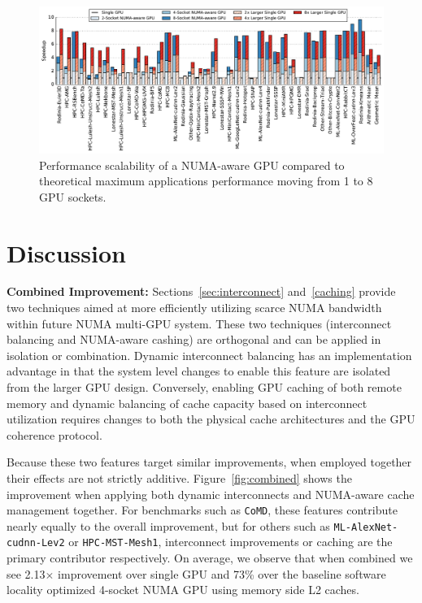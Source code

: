 \begin{figure}[t]
    \centering
    \includegraphics[width=1.0\textwidth]{figures/plot_scalability_mgpu_WB.pdf}
    \caption{Performance scalability of a NUMA-aware GPU compared to theoretical 
    maximum applications performance moving from 1 to 8 GPU sockets.}
    \label{fig:scalability}
    \vspace{-.2in}
\end{figure}

\section {Discussion}
\label{sec:discussion}
\textbf{Combined Improvement:} Sections~\ref{sec:interconnect} 
and~\ref{caching} provide two techniques aimed at more efficiently utilizing 
scarce NUMA bandwidth within future NUMA multi-GPU system. These two 
techniques (interconnect balancing and NUMA-aware cashing) are orthogonal and 
can be applied in isolation or combination.  Dynamic interconnect balancing 
has an implementation advantage in that the system level changes to enable 
this feature are isolated from the larger GPU design.  Conversely, enabling 
GPU caching of both remote memory and dynamic balancing of cache capacity 
based on interconnect utilization requires changes to both the physical cache 
architectures and the GPU coherence protocol.

Because these two features target similar improvements, when employed 
together their effects are not strictly additive.  Figure~\ref{fig:combined} 
shows the improvement when applying both dynamic interconnects and NUMA-aware 
cache management together.  For benchmarks such as \texttt{CoMD}, these 
features contribute nearly equally to the overall improvement, but for others 
such as \texttt{ML-AlexNet-cudnn-Lev2} or \texttt{HPC-MST-Mesh1}, 
interconnect improvements or caching are the primary contributor 
respectively.  On average, we observe that when combined we see 2.13$\times$ improvement over single GPU and 73\% 
over the baseline software locality optimized 4-socket NUMA GPU 
using memory side L2 caches.

